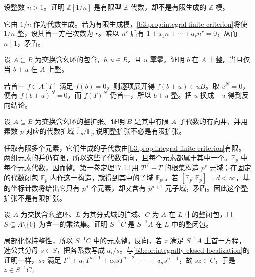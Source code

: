 \begin{exercise}\label{b3:ex:05-inverting-integers}
	设整数 \(n>1\)。证明 \(\mathbb Z[1/n]\) 是有限型 \(\mathbb Z\) 代数，却不是有限生成的 \(\mathbb Z\) 模。
\end{exercise}
\begin{solution}
	它由 \(1/n\) 作为代数生成。若为有限生成模，\cref{b3:prop:integral-finite-criterion}将使 \(1/n\) 整，设其首一方程次数为 \(r\)。乘以 \(n^r\) 后有 \(1+a_1n+\cdots+a_rn^r=0\)，从而 \(n\mid1\)，矛盾。
\end{solution}

\begin{exercise}\label{b3:ex:05-nilpotent-perturbation}
	设 \(A\subseteq B\) 为交换含幺环的包含，\(b,u\in B\)，且 \(u\) 幂零。证明 \(b\) 在 \(A\) 上整，当且仅当 \(b+u\) 在 \(A\) 上整。
\end{exercise}
\begin{solution}
	若首一 \(f\in A[T]\) 满足 \(f(b)=0\)，则逐项展开得 \(f(b+u)\in uB\)。取 \(u^N=0\)，便有 \(f(b+u)^N=0\)，而 \(f(T)^N\) 仍首一，所以 \(b+u\) 整。把 \(u\) 换成 \(-u\) 得到反向结论。
\end{solution}

\begin{exercise}\label{b3:ex:05-integral-union}
	设 \(A\subseteq B\) 为交换含幺环的整扩张。证明 \(B\) 是其中有限 \(A\) 子代数的有向并，并用素数 \(p\) 对应的代数扩域 \(\overline{\mathbb F}_p/\mathbb F_p\) 说明整扩张不必是有限扩张。
\end{exercise}
\begin{solution}
	任取有限多个元素，它们生成的子代数由\cref{b3:prop:integral-finite-criterion}有限。两组元素的并仍有限，所以这些子代数有向，且每个元素都属于其中一个。\(\overline{\mathbb F}_p\) 中每个元素代数，因而整。第一卷定理17.1.1用 \(T^{p^r}-T\) 的根集构造 \(p^r\) 元域；在固定的代数闭包 \(\overline{\mathbb F}_p\) 内作这一构造，就得到其中的子域 \(\mathbb F_{p^r}\)。若 \([\overline{\mathbb F}_p:\mathbb F_p]=d<\infty\)，基的坐标计数将给出它只有 \(p^d\) 个元素，却又含有 \(p^{d+1}\) 元子域，矛盾。因此这个整扩张不是有限扩张。
\end{solution}

\begin{exercise}\label{b3:ex:05-localize-closure}
	设 \(A\) 为交换含幺整环、\(L\) 为其分式域的扩域、\(C\) 为 \(A\) 在 \(L\) 中的整闭包，且 \(S\subseteq A\setminus\{0\}\) 为含一的乘法集。证明 \(S^{-1}C\) 是 \(S^{-1}A\) 在 \(L\) 中的整闭包。
\end{exercise}
\begin{solution}
	局部化保持整性，所以 \(S^{-1}C\) 中的元素整。反向，若 \(z\) 满足 \(S^{-1}A\) 上首一方程，选公共分母 \(s\in S\)，把各系数写成 \(a_i/s\)。与\cref{b3:cor:integrally-closed-localization}的证明一样，\(sz\) 满足 \(T^n+a_1T^{n-1}+a_2sT^{n-2}+\cdots+a_ns^{n-1}\)，故 \(sz\in C\)，于是 \(z\in S^{-1}C\)。
\end{solution}


